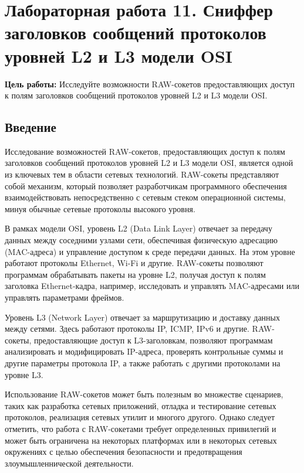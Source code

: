 \chapter*{Лабораторная работа 11. Сниффер заголовков сообщений протоколов уровней L2 и L3 модели OSI}

\textbf{Цель работы:} Исследуйте возможности RAW-сокетов предоставляющих доступ к полям заголовков сообщений протоколов уровней L2 и L3 модели OSI.

\section*{Введение}

Исследование возможностей RAW-сокетов, предоставляющих доступ к полям заголовков сообщений протоколов уровней L2 и L3 модели OSI, является одной из ключевых тем в области сетевых технологий. RAW-сокеты представляют собой механизм, который позволяет разработчикам программного обеспечения взаимодействовать непосредственно с сетевым стеком операционной системы, минуя обычные сетевые протоколы высокого уровня.

В рамках модели OSI, уровень L2 (Data Link Layer) отвечает за передачу данных между соседними узлами сети, обеспечивая физическую адресацию (MAC-адреса) и управление доступом к среде передачи данных. На этом уровне работают протоколы Ethernet, Wi-Fi и другие. RAW-сокеты позволяют программам обрабатывать пакеты на уровне L2, получая доступ к полям заголовка Ethernet-кадра, например, исследовать и управлять MAC-адресами или управлять параметрами фреймов.

Уровень L3 (Network Layer) отвечает за маршрутизацию и доставку данных между сетями. Здесь работают протоколы IP, ICMP, IPv6 и другие. RAW-сокеты, предоставляющие доступ к L3-заголовкам, позволяют программам анализировать и модифицировать IP-адреса, проверять контрольные суммы и другие параметры протокола IP, а также работать с другими протоколами на уровне L3.

Использование RAW-сокетов может быть полезным во множестве сценариев, таких как разработка сетевых приложений, отладка и тестирование сетевых протоколов, реализация сетевых утилит и многого другого. Однако следует отметить, что работа с RAW-сокетами требует определенных привилегий и может быть ограничена на некоторых платформах или в некоторых сетевых окружениях с целью обеспечения безопасности и предотвращения злоумышленнической деятельности.

